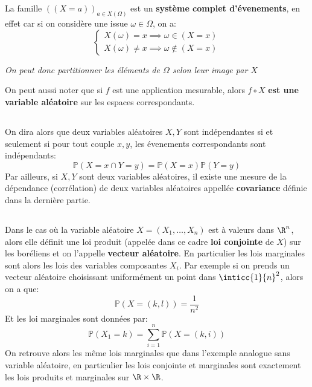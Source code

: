 \subsection*{}
La famille \(((X = a))_{a \in X(\Omega)}\) est un \textbf{système complet d'évenements}, en effet car si on considère une issue \(\omega \in \Omega\), on a:
\[
   \begin{cases}
      X(\omega) = x \implies \omega \in (X = x)\\  
      X(\omega) \neq x \implies \omega \notin (X = x)   
   \end{cases} 
\]
\begin{center}
   \textit{On peut donc partitionner les éléments de \(\Omega\) selon leur image par \(X\)}
\end{center}
On peut aussi noter que si \(f\) est une application mesurable, alors \(f \circ X\) \textbf{est une variable aléatoire} sur les espaces correspondants.
\pagebreak
\subsection*{}
On dira alors que deux variables aléatoires \(X, Y\) sont indépendantes si et seulement si pour tout couple \(x, y\), les évenements correspondants sont indépendants:
\[
   \mathbb{P}(X = x \cap Y = y) = \mathbb{P}(X = x)\mathbb{P}(Y = y)  
\]
Par ailleurs, si \(X, Y\) sont deux variables aléatoires, il existe une mesure de la dépendance (corrélation) de deux variables aléatoires appellée \textbf{covariance} définie dans la dernière partie.
\subsection*{}
Dans le cas où la variable aléatoire \( X = (X_1, \ldots, X_n) \) est à valeurs dans \( \R^n \), alors elle définit une loi produit (appelée dans ce cadre \textbf{loi conjointe} de \( X \)) sur les boréliens et on l'appelle \textbf{vecteur aléatoire}. En particulier les lois marginales sont alors les lois des variables composantes \( X_i \). Par exemple si on prends un vecteur aléatoire choisissant uniformément un point dans \( \inticc{1}{n}^2 \), alors on a que:
\[ 
   \mathbb{P}(X = (k, l)) = \frac{1}{n^2} 
\]
Et les loi marginales sont données par:
\[ 
   \mathbb{P}(X_1 = k) = \sum_{i=1}^n \mathbb{P}(X = (k, i))  
\]
On retrouve alors les même lois marginales que dans l'exemple analogue sans variable aléatoire, en particulier les lois conjointe et marginales sont exactement les lois produits et marginales sur \(\R \times \R\).   
